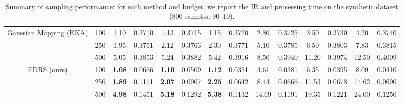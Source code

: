 \documentclass[preprint,12pt]{elsarticle}
\begin{document}
\begin{table}[!t]
{\begin{tabular}{cc|cccccccccccc}
 \multirow{3}{*}{Gaussian Mapping (RKA)} &  100    &  1.10          &  0.3710                    &  1.13          &  0.3715                    &  1.15          &  0.3720                    &  2.80          &  0.3725                    &  3.50          &  0.3730                    &  4.20          &  0.3740          \\
                                       &  250    &  1.95          &  0.3751                    &  2.12          &  0.3763                    &  2.30          &  0.3771                    &  5.10          &  0.3785                    &  6.50          &  0.3803                    &  7.83          &  0.3815          \\
                                       &  500    &  5.05          &  0.3853                    &  5.24          &  0.3882                    &  5.42          &  0.3916                    &  8.50          &  0.3940                    &  11.20         &  0.3974                    &  12.50         &  0.4009          \\ \hline

\multirow{3}{*}{EDRS (ours)}           & 100    & \textbf{1.08} & 0.0666                    & \textbf{1.10} & 0.0509                    & \textbf{1.12} & 0.0351                    & 4.61          & 0.0381                    & 6.35          & 0.0395                    & 8.09          & 0.0410          \\
                                       & 250    & \textbf{1.89} & 0.1171                    & \textbf{2.07} & 0.0907                    & \textbf{2.25} & 0.0642                    & 8.44          & 0.0666                    & 11.53         & 0.0678                    & 14.62         & 0.0690          \\
                                       & 500    & \textbf{4.98} & 0.1451                    & \textbf{5.18} & 0.1292                    & \textbf{5.38} & 0.1132                    & 14.69         & 0.1191                    & 19.35         & 0.1221                    & 24.00         & 0.1250          \\ \hline
\end{tabular}
}
\caption{\\ Summary of sampling performance: for each method and budget, we report the IR and processing time on the synthetic dataset (800 samples, 90–10).}
\label{tab:methods_dataset_synthetic_1}
\end{table}
\end{document}
